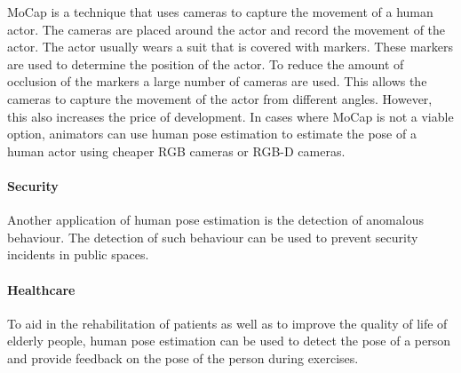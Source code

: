 MoCap is a technique that uses cameras to capture the movement of a human actor. The cameras are placed around the actor and record the movement of the actor. The actor usually wears a suit that is covered with markers. These markers are used to determine the position of the actor. To reduce the amount of occlusion of the markers a large number of cameras are used. This allows the cameras to capture the movement of the actor from different angles. However, this also increases the price of development. In cases where MoCap is not a viable option, animators can use human pose estimation to estimate the pose of a human actor using cheaper RGB cameras or RGB-D cameras.

\paragraph{Security}

Another application of human pose estimation is the detection of anomalous behaviour. The detection of such behaviour can be used to prevent security incidents in public spaces.

\paragraph{Healthcare}

To aid in the rehabilitation of patients as well as to improve the quality of life of elderly people, human pose estimation can be used to detect the pose of a person and provide feedback on the pose of the person during exercises.\cite{ClinicalApplicationChen}





